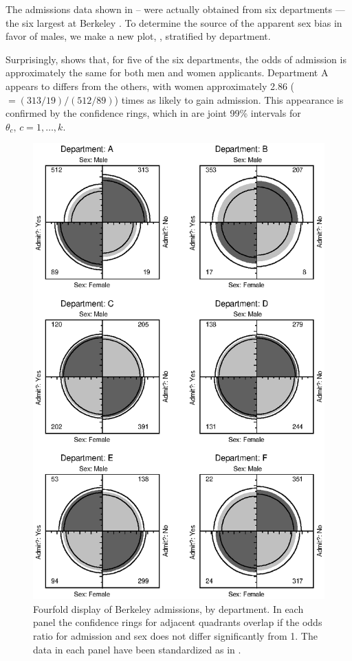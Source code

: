 The admissions data shown in
-- were actually obtained
from six departments ---the six largest at Berkeley
\citep{Bickel-etal:75}.
To determine the source of the apparent sex
bias in favor of males, we make a new plot, ,
stratified by department.

Surprisingly,  shows that, for five of the
six departments, the odds of admission is approximately the same for
both men and women applicants.  Department A appears to differs from
the others, with women approximately 2.86 (\(=  ( 313/19 )  /
(512/89)\)) times as likely to gain admission.  This appearance is
confirmed by the confidence rings, which in 
are joint 99\% intervals for \(\theta_c ,  \,  c = 1, \dots ,
k\).

\begin{figure}[htb]
  \centering
  \includegraphics[scale=.8]{ch3/fig/pie2x2b}
  \caption[Fourfold display of Berkeley
admissions, by department]{Fourfold display of Berkeley
admissions, by department.  In each panel the confidence rings for
adjacent quadrants overlap if the odds ratio for admission and sex
does not differ significantly from 1.  The data in each panel have
been standardized as in .}\label{fig:pie2x2b}
\end{figure}

